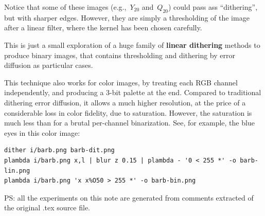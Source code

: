 Notice that some of these images (e.g.,~$Y_{20}$ and~$Q_{20}$) could pass ass
``dithering'', but with sharper edges.  However, they are simply a
thresholding of the image after a linear filter, where the kernel has been
chosen carefully.

This is just a small exploration of a huge family of {\bf linear dithering}
methods to produce binary images, that contains thresholding and dithering by
error diffusion as
particular cases.

This technique also works for color images, by treating each RGB channel
independently, and producing a 3-bit palette at the end.  Compared to
traditional dithering error diffusion, it allows a much higher resolution, at
the price of a considerable loss in color fidelity, due to saturation.
However, the saturation is much less than for a brutal per-channel
binarization.   See, for example, the
blue eyes in this color image:

\begin{verbatim}
dither i/barb.png barb-dit.png
plambda i/barb.png x,l | blur z 0.15 | plambda - '0 < 255 *' -o barb-lin.png
plambda i/barb.png 'x x%O50 > 255 *' -o barb-bin.png
\end{verbatim}
\begin{gallery}
\end{gallery}


\small
PS: all the experiments on this note are generated from comments extracted
of the original .tex source file.




